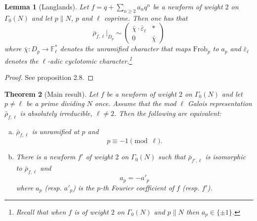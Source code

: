 \documentclass[12pt,reqno]{amsart}
\theoremstyle{plain}
\newtheorem{theorem}{Theorem}[section]
\newtheorem{lemma}[theorem]{Lemma}
\theoremstyle{definition}
\begin{document}
\begin{lemma}[Langlands]\label{locallemma}
Let $f=q+\sum_{n\geq 2}a_n q^n $ be a newform of weight $2$ on $\Gamma_0(N)$ and let $p\parallel N$, $p$ and $\ell$ coprime. Then one has that
$$
\bar\rho_{f,\ell}\vert_{D_p} \sim 
\left(
\begin{array}{cc}
\bar\chi\cdot\bar\varepsilon_\ell  &*\\
0	&\bar\chi
\end{array}
\right)
$$
where $\bar\chi:D_p\rightarrow \mathbb F^*_\ell$ denotes the unramified character that maps $\text{Frob}_p$ to $a_p$ and $\bar\varepsilon_\ell$ denotes the $\ell$-adic cyclotomic character.\footnote{Recall that when $f$ is of weight $2$ on $\Gamma_0(N)$ and $p\parallel N$ then $a_p\in \{\pm 1\}$. 
}

\end{lemma}
\begin{proof}
See \cite{LW} proposition 2.8.
\end{proof}
\begin{theorem}[Main result]\label{THEtheorem}
Let $f$ be a newform of weight $2$ on $\Gamma_0(N)$ and let $p\neq \ell$ be a prime dividing $N$ once.
Assume that the mod $\ell$ Galois representation $\bar\rho_{f,\ell}$ is absolutely irreducible, $\ell \neq 2$. Then the following are equivalent:
\begin{enumerate}[(a)]
\item $\bar{\rho}_{f,\ell}$ is unramified at $p$ and 
$$
p \equiv -1 \pmod \ell.
$$
\item There is a newform $f'$ of weight $2$ on $\Gamma_0(N)$ such that $\bar\rho_{f',\ell}$ is isomorphic to $\bar\rho_{f,\ell}$ and 
$$
a_p = -a'_p
$$
where $a_p$ (resp. $a'_p$) is the $p$-th Fourier coefficient of $f$ (resp. $f'$).
\end{enumerate}
\end{theorem}
\end{document}
